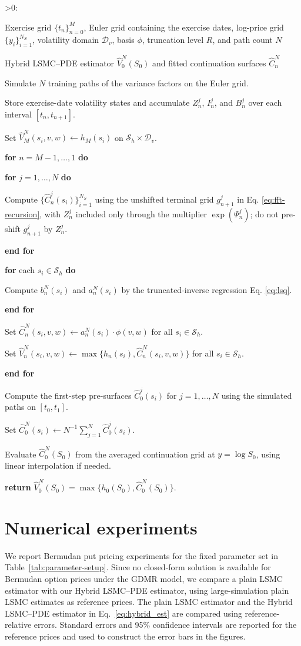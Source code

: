 \documentclass[pdflatex,sn-mathphys-num]{sn-jnl}
\makeatletter
\newcounter{ALG@line}
\newenvironment{algorithmic}[1][0]{%
  \setcounter{ALG@line}{0}%
  \def\ALG@freq{#1}%
  \begin{list}{\ifnum\ALG@freq>0\refstepcounter{ALG@line}\arabic{ALG@line}:\fi}{%
\setlength{\leftmargin}{2.2em}%
\setlength{\labelwidth}{1.8em}%
\setlength{\labelsep}{0.4em}%
\setlength{\itemsep}{2pt}%
\setlength{\parsep}{0pt}%
\setlength{\topsep}{3pt}%
  }%
}{\end{list}}
\newcommand{\Require}{\item[\textbf{Require:}]}
\newcommand{\Ensure}{\item[\textbf{Ensure:}]}
\newcommand{\State}{\item}
\newcommand{\For}[1]{\State \textbf{for} #1 \textbf{do}}
\newcommand{\EndFor}{\State \textbf{end for}}
\theoremstyle{thmstyleone}%
\theoremstyle{thmstylethree}%
\theoremstyle{thmstyletwo}%
\makeatother
\begin{document}
\begin{algorithm}[H]
\caption{Hybrid LSMC--PDE recursion}\label{alg:hybrid-LSMC--PDE}
\begin{algorithmic}[1]
\Require Exercise grid $\{t_n\}_{n=0}^M$, Euler grid containing the exercise dates, log-price grid $\{y_i\}_{i=1}^{N_S}$, volatility domain $\mathcal D_v$, basis $\phi$, truncation level $R$, and path count $N$
\Ensure Hybrid LSMC--PDE estimator $\widehat V_0^N(S_0)$ and fitted continuation surfaces $\widehat C_n^N$
\State Simulate $N$ training paths of the variance factors on the Euler grid.
\State Store exercise-date volatility states and accumulate $Z_n^j$, $I_n^j$, and $B_n^j$ over each interval $[t_n,t_{n+1}]$.
\State Set $\widehat V_M^N(s_i,v,w)\gets h_M(s_i)$ on $\mathcal S_h\times\mathcal D_v$.
\For{$n=M-1,\ldots,1$}
\For{$j=1,\ldots,N$}
\State Compute $\{\widehat C_n^j(s_i)\}_{i=1}^{N_S}$ using the unshifted terminal grid $g_{n+1}^j$ in Eq. \eqref{eq:fft-recursion}, with $Z_n^j$ included only through the multiplier $\exp(\Psi_n^j)$; do not pre-shift $g_{n+1}^j$ by $Z_n^j$.
\EndFor
\For{each $s_i\in\mathcal S_h$}
\State Compute $b_n^N(s_i)$ and $a_n^N(s_i)$ by the truncated-inverse regression Eq. \eqref{eq:lsq}.
\EndFor
\State Set $\widehat C_n^N(s_i,v,w)\gets a_n^N(s_i)\cdot\phi(v,w)$ for all $s_i\in\mathcal S_h$.
\State Set $\widehat V_n^N(s_i,v,w)\gets\max\{h_n(s_i),\widehat C_n^N(s_i,v,w)\}$ for all $s_i\in\mathcal S_h$.
\EndFor
\State Compute the first-step pre-surfaces $\widehat C_0^j(s_i)$ for $j=1,\ldots,N$ using the simulated paths on $[t_0,t_1]$.
\State Set $\widehat C_0^N(s_i)\gets N^{-1}\sum_{j=1}^{N}\widehat C_0^j(s_i)$.
\State Evaluate $\widehat C_0^N(S_0)$ from the averaged continuation grid at $y=\log S_0$, using linear interpolation if needed.
\State \textbf{return} $\widehat V_0^N(S_0)=\max\{h_0(S_0),\widehat C_0^N(S_0)\}$.
\end{algorithmic}
\end{algorithm}
\section{Numerical experiments}\label{sec:numerical}

We report Bermudan put pricing experiments for the fixed parameter set in Table~\ref{tab:parameter-setup}. Since no closed-form solution is available for Bermudan option prices under the GDMR model, we compare a plain LSMC estimator with our Hybrid LSMC--PDE estimator, using large-simulation plain LSMC estimates as reference prices. The plain LSMC estimator
\cite{longstaff2001valuing} and the Hybrid LSMC--PDE estimator in Eq.~\eqref{eq:hybrid_est} are compared using reference-relative errors. Standard errors and 95\% confidence intervals are reported for the reference prices and used to construct the error bars in the figures.
\end{document}
